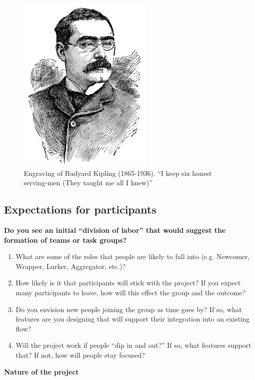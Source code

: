 \begin{figure}
\begin{center}
\includegraphics{../pictures/kipling.jpg}
\caption{Engraving of Rudyard Kipling (1865-1936). ``I keep six honest
serving-men (They taught me all I knew)''}
\end{center}
\end{figure}

\subsection{Expectations for participants}

\textbf{Do you see an initial ``division of labor'' that would suggest
the formation of teams or task groups?}

\begin{enumerate}
\item
  What are some of the roles that people are likely to fall into (e.g.
  Newcomer, Wrapper, Lurker, Aggregator, etc.)?
\item
  How likely is it that participants will stick with the project? If you
  expect many participants to leave, how will this effect the group and
  the outcome?
\item
  Do you envision new people joining the group as time goes by? If so,
  what features are you designing that will support their integration
  into an existing flow?
\item
  Will the project work if people ``dip in and out?'' If so, what
  features support that? If not, how will people stay focused?
\end{enumerate}

\textbf{Nature of the project}

